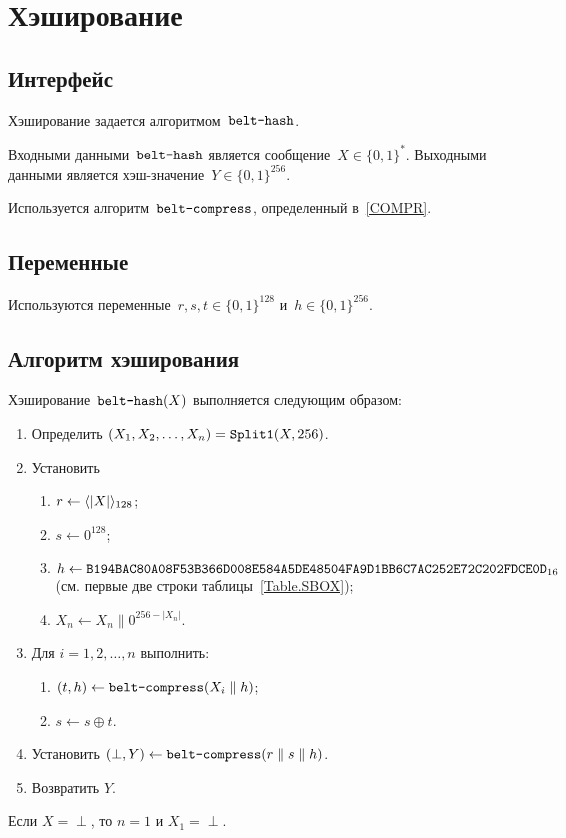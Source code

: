 \section{Хэширование}\label{HASH}

\subsection{Интерфейс}\label{HASH.IFace}

Хэширование задается алгоритмом~$\texttt{belt-hash}$.

Входными данными~$\texttt{belt-hash}$ является сообщение~$X\in\{0,1\}^*$.
%
Выходными данными является хэш-значение~$Y\in\{0,1\}^{256}$.

Используется алгоритм~$\texttt{belt-compress}$, определенный в~\ref{COMPR}.

\subsection{Переменные}\label{HASH.Vars}

Используются переменные~$r,s,t\in\{0,1\}^{128}$ и~$h\in\{0,1\}^{256}$.

\subsection{Алгоритм хэширования}\label{HASH.Alg}

Хэширование~$\texttt{belt-hash}(X)$ выполняется следующим образом:
\begin{enumerate}
\item
Определить $(X_1,X_2,\ldots,X_n)=\mathop{\texttt{Split1}}\nolimits(X, 256)$.

\item
Установить
\begin{enumerate}
\item
$r\leftarrow \langle|X|\rangle_{128}$;
\item
$s\leftarrow 0^{128}$;
\item
$h\leftarrow\texttt{B194BAC80A08F53B366D008E584A5DE48504FA9D1BB6C7AC252E72C202FDCE0D}_{16}$ 
(см. первые две строки таблицы~\ref{Table.SBOX});
\item
$X_n\leftarrow X_n \parallel 0^{256-|X_n|}$.
\end{enumerate}

\item
Для $i=1,2,\ldots,n$ выполнить:
\begin{enumerate}
\item
$(t,h)\leftarrow\texttt{belt-compress}(X_i\parallel h)$;
\item
$s\leftarrow s\oplus t$.
\end{enumerate}

\item
Установить 
$(\perp,Y)\leftarrow\texttt{belt-compress}(r\parallel s\parallel h)$.

\item
Возвратить $Y$.
\end{enumerate}

\begin{note*}
Если $X=\perp$, то $n=1$ и $X_1=\perp$.
\end{note*}
